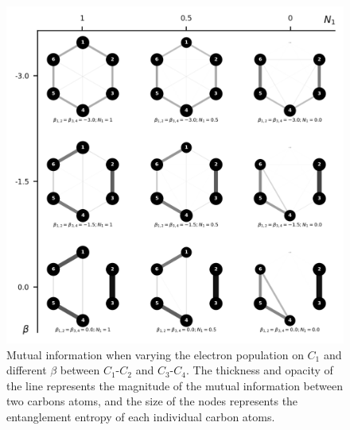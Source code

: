 \documentclass[twoside,twocolumn,9pt]{article}
\begin{document}
\begin{center}
  \begin{figure}[!htbp]
      \includegraphics[width=\textwidth]{Benzene-correlation-potential-and-two-betas-to-zero-adjacent.png}
      \caption{Mutual information when varying the electron population on $C_1$ and different $\beta$ between $C_1$-$C_2$ and $C_3$-$C_4$.  The thickness and opacity of the line represents the magnitude of the mutual information between two carbons atoms, and the size of the nodes represents the entanglement entropy of each individual carbon atoms.}
      \label{Diels-alder-1-correlation}
  \end{figure}
\end{center}
\end{document}
